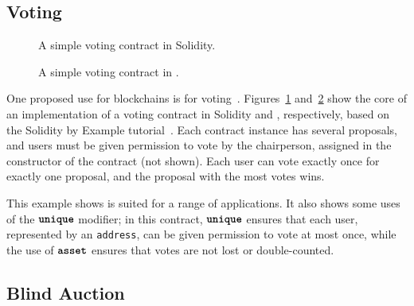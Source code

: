 \documentclass[dvipsnames,runningheads]{llncs}
\begin{document}
\subsection{Voting}\label{sec:voting-impl}
\begin{figure}
    \vspace{-2em}
    \centering
    
    \vspace{-1em}
    \caption{A simple voting contract in Solidity.}
    \label{fig:voting-impl-sol}
    \vspace{-1em}
\end{figure}
\begin{figure}
    \centering
    
    \vspace{-1em}
    \caption{A simple voting contract in \langName.}
    \label{fig:voting-impl-flow}
\end{figure}
One proposed use for blockchains is for voting~\cite{Elsden18:Making}.
Figures~\ref{fig:voting-impl-sol} and~\ref{fig:voting-impl-flow} show the core of an implementation of a voting contract in Solidity and \langName, respectively, based on the Solidity by Example tutorial~\cite{solidityByExample}.
Each contract instance has several proposals, and users must be given permission to vote by the chairperson, assigned in the constructor of the contract (not shown).
Each user can vote exactly once for exactly one proposal, and the proposal with the most votes wins.

This example shows \langName is suited for a range of applications.
It also shows some uses of the $\textbf{\texttt{unique}}$ modifier; in this contract, $\textbf{\texttt{unique}}$ ensures that each user, represented by an \lstinline{address}, can be given permission to vote at most once, while the use of $\textbf{\texttt{asset}}$ ensures that votes are not lost or double-counted.


\subsection{Blind Auction}\label{sec:blind-auction-impl}
\begin{figure}
    \centering
    
    \vspace{-1em}
    \caption{}
    \label{fig:blind-auction-impl-flow}
\end{figure}
\end{document}
